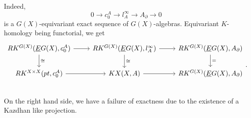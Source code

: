 Indeed, 
\[ 0 \rightarrow  c_0^A \rightarrow l^\infty_A \rightarrow A_\partial \rightarrow 0\]
is a $G(X)$-equivariant exact sequence of $G(X)$-algebras. Equivariant $K$-homology being functorial, we get 
\[\begin{tikzcd} 
RK^{G(X)}(\underline E G(X) , c_0^A)  \arrow{r}\arrow{d}{\cong} &  RK^{G(X)}(\underline E G(X) , l^\infty_A) \arrow{r}\arrow{d}{\cong} & RK^{G(X)}(\underline E G(X) , A_\partial ) \arrow{d}{=}\\
 RK^{X\times X}(pt , c_0^A) \arrow{r}& KX(X,A) \arrow{r} &  RK^{G(X)}(\underline E G(X) , A_\partial ) \\
\end{tikzcd}.\]
On the right hand side, we have a failure of exactness due to the existence of a Kazdhan like projection.



















































